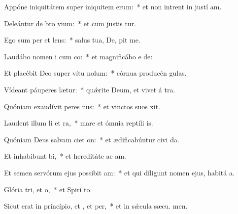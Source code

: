 \item Appóne iniquitátem super iniquitem erum:~* et non intrent in justí am.
\item Deleántur de bro vium:~* et cum justis  tur.
\item Ego sum per et lens:~* salus tua, De, pit me.
\item Laudábo nomen i cum co:~* et magnificábo e  de:
\item Et placébit Deo super vítu nolum:~* córnua producén  gulas.
\item Vídeant páuperes  lætur:~* quǽrite Deum, et vivet á tra.
\item Quóniam exaudívit peres nus:~* et vinctos suos  xit.
\item Laudent illum li et ra,~* mare et ómnia reptíli  is.
\item Quóniam Deus salvam ciet on:~* et ædificabúntur civi da.
\item Et inhabibunt bi,~* et hereditáte ac am.
\item Et semen servórum ejus possibit am:~* et qui díligunt nomen ejus, habitá  a.
\item Glória tri, et o,~* et Spirí to.
\item Sicut erat in princípio, et , et per,~* et in sǽcula sæcu. men.
